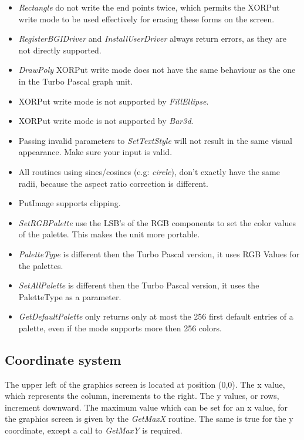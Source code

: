 \begin{itemize}
\item \textit{Rectangle} do not write
  the end points twice, which permits the XORPut write mode to be used
  effectively for erasing these forms on the screen.
\item \textit{RegisterBGIDriver} and \textit{InstallUserDriver} always
  return errors, as they are not directly supported.
\item \textit{DrawPoly} XORPut write mode does not have the same behaviour
 as the one in the Turbo Pascal graph unit.
\item XORPut write mode is not supported by \textit{FillEllipse}.
\item XORPut write mode is not supported by \textit{Bar3d}.
\item Passing invalid parameters to \textit{SetTextStyle} will not
  result in the same visual appearance. Make sure your input is valid.
\item All routines using sines/cosines (e.g: \textit{circle}), don't
 exactly have the same radii, because the aspect ratio correction is
 different.
\item PutImage supports clipping.
\item \textit{SetRGBPalette} use the LSB's of the RGB components to
set the color values of the palette. This makes the unit more portable.
\item \textit{PaletteType} is different then the Turbo Pascal version,
  it uses RGB Values for the palettes.
\item \textit{SetAllPalette} is different then the Turbo Pascal version,
  it uses the PaletteType as a parameter.
\item \textit{GetDefaultPalette} only returns only at most the 256 first
  default entries of a palette, even if the mode supports more then
  256 colors.
\end{itemize}

\subsection{Coordinate system}
The upper left of the graphics screen is located at position (0,0). The x
value, which represents the column, increments to the right. The y values,
or rows, increment downward. The maximum value which can be set for an x
value, for the graphics screen is given by the \textit{GetMaxX} routine.
The same is true for the y coordinate, except a call to \textit{GetMaxY}
is required.

